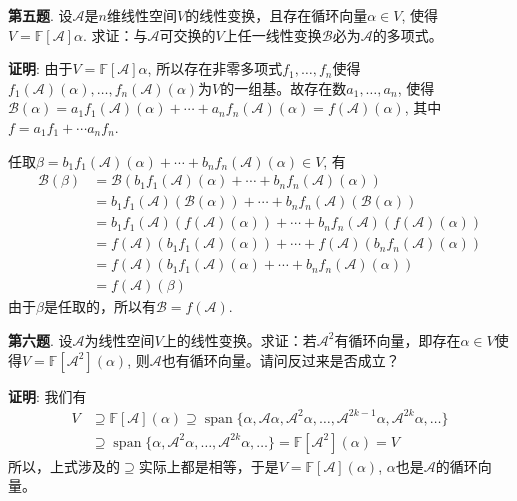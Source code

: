 {\newpageorvspace


{\bf 第五题}. 设$\mathscr{A}$是$n$维线性空间$V$的线性变换，且存在循环向量$\alpha \in V$, 使得$V = \mathbb{F}[\mathscr{A}]\alpha$. 求证：与$\mathscr{A}$可交换的$V$上任一线性变换$\mathscr{B}$必为$\mathscr{A}$的多项式。


{\bf 证明}: 由于$V = \mathbb{F}[\mathscr{A}]\alpha$, 所以存在非零多项式$f_1, \ldots, f_n$使得$f_1(\mathscr{A})(\alpha), \ldots, f_n(\mathscr{A})(\alpha)$为$V$的一组基。故存在数$a_1, \ldots, a_n$, 使得$\mathscr{B}(\alpha) = a_1 f_1(\mathscr{A})(\alpha) + \cdots + a_n f_n(\mathscr{A})(\alpha) = f(\mathscr{A})(\alpha)$, 其中$f = a_1 f_1 + \cdots a_n f_n$.

任取$\beta = b_1 f_1(\mathscr{A})(\alpha) + \cdots + b_n f_n(\mathscr{A})(\alpha) \in V$, 有
\begin{align*}
\mathscr{B} (\beta) & = \mathscr{B} (b_1 f_1(\mathscr{A})(\alpha) + \cdots + b_n f_n(\mathscr{A})(\alpha)) \\
& = b_1 f_1(\mathscr{A}) (\mathscr{B}(\alpha)) + \cdots + b_n f_n(\mathscr{A})(\mathscr{B}(\alpha)) \\
& = b_1 f_1(\mathscr{A}) (f(\mathscr{A})(\alpha)) + \cdots + b_n f_n(\mathscr{A})(f(\mathscr{A})(\alpha)) \\
& = f(\mathscr{A})(b_1 f_1(\mathscr{A})(\alpha)) + \cdots + f(\mathscr{A})(b_n f_n(\mathscr{A})(\alpha)) \\
& = f(\mathscr{A}) (b_1 f_1(\mathscr{A})(\alpha) + \cdots + b_n f_n(\mathscr{A})(\alpha)) \\
& = f(\mathscr{A}) (\beta)
\end{align*}
由于$\beta$是任取的，所以有$\mathscr{B} = f(\mathscr{A})$.


\newpageorvspace


{\bf 第六题}. 设$\mathscr{A}$为线性空间$V$上的线性变换。求证：若$\mathscr{A}^2$有循环向量，即存在$\alpha\in V$使得$V = \mathbb{F}[\mathscr{A}^2](\alpha)$, 则$\mathscr{A}$也有循环向量。请问反过来是否成立？


{\bf 证明}: 我们有
\begin{align*}
V & \supseteq \mathbb{F}[\mathscr{A}](\alpha) \supseteq \operatorname{span} \{ \alpha, \mathscr{A}\alpha, \mathscr{A}^2\alpha, \ldots, \mathscr{A}^{2k-1}\alpha, \mathscr{A}^{2k}\alpha, \ldots \} \\
& \supseteq \operatorname{span} \{ \alpha, \mathscr{A}^2\alpha, \ldots, \mathscr{A}^{2k}\alpha, \ldots \} = \mathbb{F}[\mathscr{A}^2](\alpha) = V
\end{align*}
所以，上式涉及的$\supseteq$实际上都是相等，于是$V = \mathbb{F}[\mathscr{A}](\alpha)$, $\alpha$也是$\mathscr{A}$的循环向量。

}
